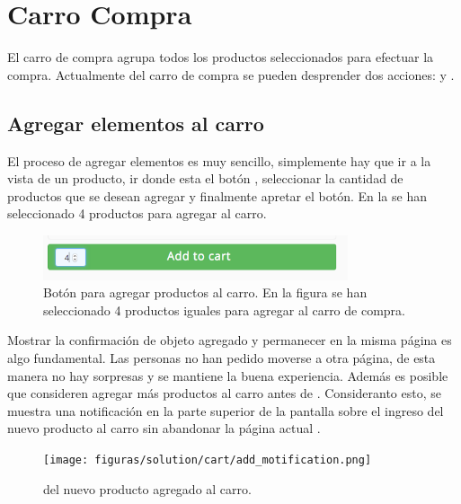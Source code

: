 \section{Carro Compra}
	El carro de compra agrupa todos los productos seleccionados para efectuar la compra. Actualmente del carro de compra se pueden desprender dos acciones:  y .

	\subsection{Agregar elementos al carro}\label{chapter:section:carro_compra:subsection:add}


		El proceso de agregar elementos es muy sencillo, simplemente hay que ir a la vista de un producto, ir donde esta el botón \addtocartLABEL, seleccionar la cantidad de productos que se desean agregar y finalmente apretar el botón. En la  se han seleccionado 4 productos para agregar al carro.

		\begin{figure}[H]
			\centering
			\includegraphics[width=0.8\textwidth]{figuras/solution/cart/button.png}
			\caption{Botón para agregar productos al carro. En la figura se han seleccionado 4 productos iguales para agregar al carro de compra.}
			\label{figure:solution:cart:button}
		\end{figure}

		Mostrar la confirmación de objeto agregado y permanecer en la misma página es algo fundamental. Las personas no han pedido moverse a otra página, de esta manera no hay sorpresas y se mantiene la buena experiencia. Además es posible que consideren agregar más productos al carro antes de \checkoutCOM \cite{online_official_conversionxl_checkout_flow}. Consideranto esto, se muestra una notificación en la parte superior de la pantalla sobre el ingreso del nuevo producto al carro sin abandonar la página actual .

		\begin{figure}[H]
			\centering
			\texttt{[image: figuras/solution/cart/add\_motification.png]}
			\caption{\FeedbackCPT del nuevo producto agregado al carro.}
			\label{figure:solution:cart:add_motification}
		\end{figure}

